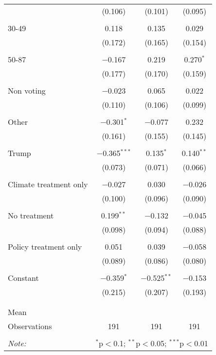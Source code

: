 \begin{tabular}{@{\extracolsep{5pt}}lccc}
  & (0.106) & (0.101) & (0.095) \\ 
  & & & \\ 
 30-49 & 0.118 & 0.135 & 0.029 \\ 
  & (0.172) & (0.165) & (0.154) \\ 
  & & & \\ 
 50-87 & $-$0.167 & 0.219 & 0.270$^{*}$ \\ 
  & (0.177) & (0.170) & (0.159) \\ 
  & & & \\ 
 Non voting & $-$0.023 & 0.065 & 0.022 \\ 
  & (0.110) & (0.106) & (0.099) \\ 
  & & & \\ 
 Other & $-$0.301$^{*}$ & $-$0.077 & 0.232 \\ 
  & (0.161) & (0.155) & (0.145) \\ 
  & & & \\ 
 Trump & $-$0.365$^{***}$ & 0.135$^{*}$ & 0.140$^{**}$ \\ 
  & (0.073) & (0.071) & (0.066) \\ 
  & & & \\ 
 Climate treatment only & $-$0.027 & 0.030 & $-$0.026 \\ 
  & (0.100) & (0.096) & (0.090) \\ 
  & & & \\ 
 No treatment & 0.199$^{**}$ & $-$0.132 & $-$0.045 \\ 
  & (0.098) & (0.094) & (0.088) \\ 
  & & & \\ 
 Policy treatment only & 0.051 & 0.039 & $-$0.058 \\ 
  & (0.089) & (0.086) & (0.080) \\ 
  & & & \\ 
 Constant & $-$0.359$^{*}$ & $-$0.525$^{**}$ & $-$0.153 \\ 
  & (0.215) & (0.207) & (0.193) \\ 
  & & & \\ 
\hline \\[-1.8ex] 
Mean &  &  &  \\ 
Observations & 191 & 191 & 191 \\ 
\hline 
\hline \\[-1.8ex] 
\textit{Note:}  & \multicolumn{3}{r}{$^{*}$p$<$0.1; $^{**}$p$<$0.05; $^{***}$p$<$0.01} \\ 
\end{tabular} 
